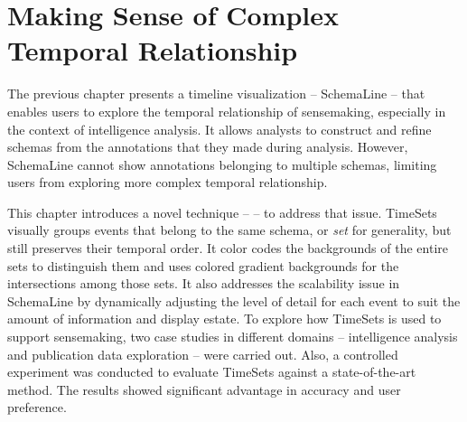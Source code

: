 \chapter{Making Sense of Complex Temporal Relationship}
\label{chap:timesets}

\graphicspath{{Chapter4/figures/}}


\pagebreak
The previous chapter presents a timeline visualization -- SchemaLine -- that enables users to explore the temporal relationship of sensemaking, especially in the context of intelligence analysis. It allows analysts to construct and refine schemas from the annotations that they made during analysis. However, SchemaLine cannot show annotations belonging to multiple schemas, limiting users from exploring more complex temporal relationship. 

This chapter introduces a novel technique -- \emph{} -- to address that issue. TimeSets visually groups events that belong to the same schema, or \emph{set} for generality, but still preserves their temporal order. It color codes the backgrounds of the entire sets to distinguish them and uses colored gradient backgrounds for the intersections among those sets. It also addresses the scalability issue in SchemaLine by dynamically adjusting the level of detail for each event to suit the amount of information and display estate. To explore how TimeSets is used to support sensemaking, two case studies in different domains -- intelligence analysis and publication data exploration -- were carried out. Also, a controlled experiment was conducted to evaluate TimeSets against a state-of-the-art method. The results showed significant advantage in accuracy and user preference.








